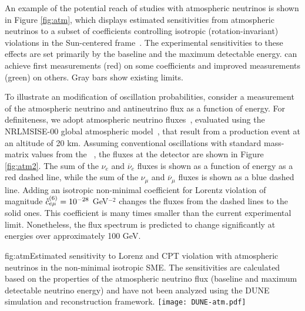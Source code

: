 An example of the potential reach of studies with  atmospheric neutrinos
is shown in Figure \ref{fig:atm},
which displays estimated sensitivities
from  atmospheric neutrinos to a subset of coefficients 
controlling isotropic (rotation-invariant) violations 
in the Sun-centered frame~\cite{Kostelecky:2002hh}.
The experimental sensitivities to these effects
are set primarily by the baseline and the maximum detectable energy.
 can achieve first measurements (red) on some coefficients
and improved measurements (green) on others.
Gray bars show existing limits.

To illustrate an  modification of oscillation probabilities,
consider a measurement of the atmospheric neutrino and antineutrino flux
as a function of energy.
For definiteness,
we adopt atmospheric neutrino fluxes~\cite{Honda:2015fha},
evaluated using the NRLMSISE-00 global atmospheric model~\cite{Picone},
that result from a production event at an altitude of 20 km.
Assuming conventional oscillations with standard mass-matrix values from the
~\cite{Tanabashi:2018oca},
the fluxes at the detector are shown in Figure \ref{fig:atm2}.
The sum of the $\nu_e$ and $\overline\nu_e$ fluxes
is shown as a function of energy as a red dashed line, 
while the sum of the $\nu_\mu$ and $\overline\nu_\mu$ fluxes 
is shown as a blue dashed line. 
Adding an isotropic non-minimal coefficient for Lorentz violation
of magnitude $\mathaccent'27 c^{(6)}_{e \mu} = 10^{-28}$ GeV$^{-2}$
changes the fluxes from the dashed lines to the solid ones.
This coefficient is many times smaller
than the current experimental limit.
Nonetheless,
the flux spectrum is predicted to change significantly 
at energies over approximately 100 GeV. 

\begin{dunefigure}{fig:atm}{Estimated sensitivity to Lorenz and CPT violation with atmospheric neutrinos in the non-minimal isotropic SME. The sensitivities are calculated based on the properties of the atmospheric neutrino flux (baseline and maximum detectable neutrino energy) and have not been analyzed using the DUNE simulation and reconstruction framework.}
\texttt{[image: DUNE-atm.pdf]}
\end{dunefigure}

